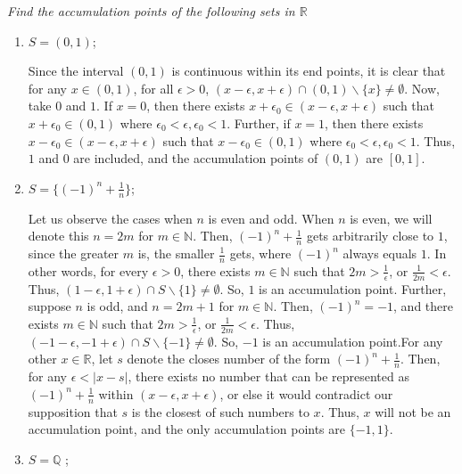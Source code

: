 \documentclass[
]{article}
\begin{document}
\textit{Find the accumulation points of the following sets in $\mathbb{R}$}\\

\begin{enumerate}

\item $S = (0,1)$;  
  
Since the interval $(0,1)$ is continuous within its end points, it is clear that for any $x \in (0, 1)$, for all $\epsilon > 0$, $(x - \epsilon, x + \epsilon) \cap (0, 1) \backslash \{x\} \neq \emptyset$. Now, take $0$ and $1$. If $x = 0$, then there exists $x + \epsilon_0 \in (x - \epsilon, x + \epsilon)$ such that $x + \epsilon_0 \in (0, 1)$ where $\epsilon_0 < \epsilon, \epsilon_0 < 1$. Further, if $x = 1$, then there exists $x - \epsilon_0 \in (x - \epsilon, x + \epsilon)$ such that $x - \epsilon_0 \in (0, 1)$ where $\epsilon_0 < \epsilon, \epsilon_0 < 1$. Thus, $1$ and $0$ are included, and the accumulation points of $(0,1)$ are $[0, 1]$. 

\item \textit{$S = \{(-1)^n + \frac{1}{n}\}$};  
  
Let us observe the cases when $n$ is even and odd. When $n$ is even, we will denote this $n = 2m$ for $m \in \mathbb{N}$. Then, $(-1)^n + \frac{1}{n}$ gets arbitrarily close to $1$, since the greater $m$ is, the smaller $\frac{1}{n}$ gets, where $(-1)^n$ always equals $1$. In other words, for every $\epsilon > 0$, there exists $m \in \mathbb{N}$ such that $2m >  \frac{1}{\epsilon}$, or $\frac{1}{2m} < \epsilon$. Thus, $(1 - \epsilon, 1 + \epsilon) \cap S \backslash \{1\} \neq \emptyset$. So, $1$ is an accumulation point. Further, suppose $n$ is odd, and $n = 2m + 1$ for $m \in \mathbb{N}$. Then, $(-1)^n = -1$, and there exists $m \in \mathbb{N}$ such that $2m >  \frac{1}{\epsilon}$, or $\frac{1}{2m} < \epsilon$. Thus, $(-1 - \epsilon, -1 + \epsilon) \cap S \backslash \{-1\} \neq \emptyset$. So, $-1$ is an accumulation point.For any other $x \in \mathbb{R}$, let $s$ denote the closes number of the form $(-1)^n + \frac{1}{n}$. Then, for any $\epsilon < |x - s|$, there exists no number that can be represented as $(-1)^n + \frac{1}{n}$ within $(x - \epsilon, x + \epsilon)$, or else it would contradict our supposition that $s$ is the closest of such numbers to $x$. Thus, $x$ will not be an accumulation point, and the only accumulation points are $\{-1, 1\}$. 

\item $S = \mathbb{Q}$  ;
  

\end{enumerate}
\end{document}
